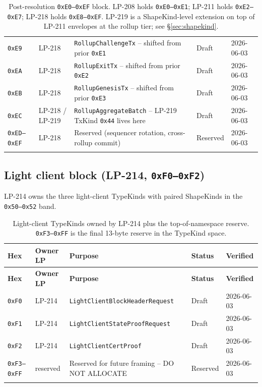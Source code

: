 \begin{longtable}{@{}p{1.9cm}p{1.7cm}p{6.4cm}p{1.4cm}p{1.6cm}@{}}
\texttt{0xE9} & LP-218 & \texttt{RollupChallengeTx} -- shifted from prior \texttt{0xE1} & Draft & 2026-06-03 \\
\texttt{0xEA} & LP-218 & \texttt{RollupExitTx} -- shifted from prior \texttt{0xE2} & Draft & 2026-06-03 \\
\texttt{0xEB} & LP-218 & \texttt{RollupGenesisTx} -- shifted from prior \texttt{0xE3} & Draft & 2026-06-03 \\
\texttt{0xEC} & LP-218 / LP-219 & \texttt{RollupAggregateBatch} -- LP-219 TxKind \texttt{0x44} lives here & Draft & 2026-06-03 \\
\texttt{0xED--0xEF} & LP-218 & Reserved (sequencer rotation, cross-rollup commit) & Reserved & 2026-06-03 \\
\bottomrule
\caption{Post-resolution \texttt{0xE0--0xEF} block. LP-208 holds
\texttt{0xE0--0xE1}; LP-211 holds \texttt{0xE2--0xE7}; LP-218 holds
\texttt{0xE8--0xEF}. LP-219 is a ShapeKind-level extension on top of
LP-211 envelopes at the rollup tier; see \S\ref{sec:shapekind}.}
\label{tab:typekind-mempool}
\end{longtable}

\subsection{Light client block (LP-214, \texttt{0xF0--0xF2})}

LP-214 owns the three light-client TypeKinds with paired ShapeKinds
in the \texttt{0x50--0x52} band.

\begin{longtable}{@{}p{1.9cm}p{1.4cm}p{6.7cm}p{1.4cm}p{1.6cm}@{}}
\toprule
\textbf{Hex} & \textbf{Owner LP} & \textbf{Purpose} & \textbf{Status} & \textbf{Verified} \\
\midrule
\endfirsthead
\toprule
\textbf{Hex} & \textbf{Owner LP} & \textbf{Purpose} & \textbf{Status} & \textbf{Verified} \\
\midrule
\endhead
\texttt{0xF0} & LP-214 & \texttt{LightClientBlockHeaderRequest} & Draft & 2026-06-03 \\
\texttt{0xF1} & LP-214 & \texttt{LightClientStateProofRequest} & Draft & 2026-06-03 \\
\texttt{0xF2} & LP-214 & \texttt{LightClientCertProof} & Draft & 2026-06-03 \\
\texttt{0xF3--0xFF} & reserved & Reserved for future framing -- DO NOT ALLOCATE & Reserved & 2026-06-03 \\
\bottomrule
\caption{Light-client TypeKinds owned by LP-214 plus the
top-of-namespace reserve. \texttt{0xF3--0xFF} is the final 13-byte
reserve in the TypeKind space.}
\label{tab:typekind-lp214}
\end{longtable}
